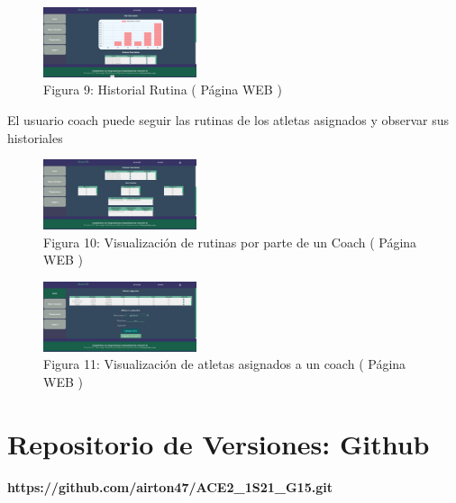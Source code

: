 \documentclass[osajnl,twocolumn,showpacs,superscriptaddress,10pt]{revtex4-1}
\begin{document}
\begin{figure} [H] \centering 
\caption{Figura 9: Historial Rutina ( Página WEB )}
\includegraphics[width=0.4\textwidth]{hist.jpg}
\end{figure}

    El usuario coach puede seguir las rutinas de los atletas asignados y observar sus historiales
    
\begin{figure} [H] \centering 
\caption{Figura 10: Visualización de rutinas por parte de un Coach ( Página WEB )}
\includegraphics[width=0.4\textwidth]{HistAtle.jpg}
\end{figure}

\begin{figure} [H] \centering 
\caption{Figura 11: Visualización de atletas asignados a un coach ( Página WEB )}
\includegraphics[width=0.4\textwidth]{AsigAtle.jpg}
\end{figure}



\section{Repositorio de Versiones: Github}

\textbf{https://github.com/airton47/ACE2_1S21_G15.git}
\end{document}
